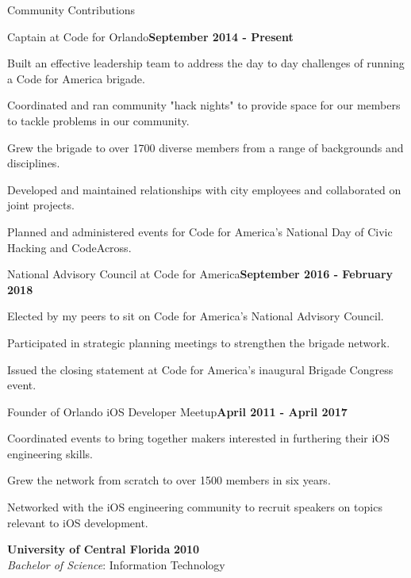 \documentclass{resume} %
\begin{document}
\begin{rSection}{Community Contributions}

\begin{rSubsection}{Captain at Code for Orlando}{\bf September 2014 - Present}{}{}

\item Built an effective leadership team to address the day to day challenges of running a Code for America brigade.
\item Coordinated and ran community "hack nights" to provide space for our members to tackle problems in our community.
\item Grew the brigade to over 1700 diverse members from a range of backgrounds and disciplines.
\item Developed and maintained relationships with city employees and collaborated on joint projects.
\item Planned and administered events for Code for America's National Day of Civic Hacking and CodeAcross.


\end{rSubsection}

\begin{rSubsection}{National Advisory Council at Code for America}{\bf September 2016 - February 2018}{}{}

\item Elected by my peers to sit on Code for America's National Advisory Council.
\item Participated in strategic planning meetings to strengthen the brigade network.
\item Issued the closing statement at Code for America's inaugural Brigade Congress event.


\end{rSubsection}

\begin{rSubsection}{Founder of Orlando iOS Developer Meetup}{\bf April 2011 - April 2017}{}{}

\item Coordinated events to bring together makers interested in furthering their iOS engineering skills.
\item Grew the network from scratch to over 1500 members in six years.
\item Networked with the iOS engineering community to recruit speakers on topics relevant to iOS development.


\end{rSubsection}

{\bf University of Central Florida} \hfill {\bf 2010} \\ 
{\it Bachelor of Science}: Information Technology \\
\end{rSection}
\end{document}
